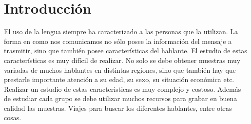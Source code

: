 \documentclass[11pt,a4paper,twoside]{tesis}
\begin{document}
\def\titulo{Licenciado }

\def\autor{Fernando Bugni}
\def\tituloTesis{Recolección online de grabaciones para el estudio de las variantes argentinas del español}
\def\runtitulo{Recolección online de grabaciones para el estudio de las variantes argentinas del español}
\def\runtitle{Star Wars: Rebellion and Empire}
\def\director{Agustín Gravano}
\def\codirector{Miguel Martínez Soler}
\def\lugar{Buenos Aires, 2014}


\frontmatter
\pagestyle{empty}


%

\cleardoublepage

\cleardoublepage

\cleardoublepage
\tableofcontents

\mainmatter
\pagestyle{headings}


\chapter{Introducción}


El uso de la lengua siempre ha caracterizado a las personas que la utilizan. La forma en como nos comunicamos no sólo posee la información del mensaje a trasmitir, sino que también posee características del hablante. El estudio de estas características es muy difícil de realizar. No solo se debe obtener muestras muy variadas de muchos hablantes en distintas regiones, sino que también hay que prestarle importante atención a su edad, su sexo, su situación económica etc. Realizar un estudio de estas caracteristicas es muy complejo y costoso. Además de estudiar cada grupo se debe utilizar muchos recursos para grabar en buena calidad las muestras. Viajes para buscar los diferentes hablantes, entre otras cosas. 
\end{document}
